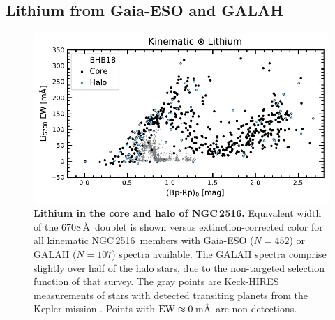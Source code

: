 \documentclass[12pt,twocolumn,tighten]{aastex63}
\newcommand{\cn}{NGC\,2516} %
\begin{document}
\subsection{Lithium from Gaia-ESO and GALAH}
\label{subsec:lithium}

\begin{figure}[t]
	\begin{center}
		\leavevmode
			\includegraphics[width=1\textwidth]{f5a.pdf}
	\end{center}
	\vspace{-0.7cm}
  \caption{ {\bf Lithium in the core and halo of NGC\,2516.}
  Equivalent width of the 6708\,\AA\ doublet is shown versus
  extinction-corrected color for all kinematic \cn\ members with
  Gaia-ESO ($N=452$) or GALAH ($N=107$) spectra available.  The GALAH
  spectra comprise slightly over half of the halo stars, due to the
  non-targeted selection function of that survey.  The gray points are
  Keck-HIRES measurements of stars with detected transiting planets
  from the Kepler mission \citep{berger_identifying_2018}.  Points
  with ${\rm EW}\approx0\,$m\AA\ are non-detections.
  \label{fig:lithiumcorehalo}
  }
\end{figure}
\end{document}
